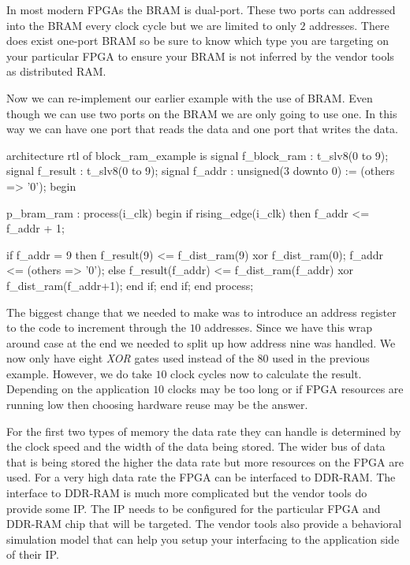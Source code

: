 In most modern \ac{FPGA}s the \ac{BRAM} is dual-port. These two ports can addressed into the \ac{BRAM} every clock cycle but we are limited to only $2$ addresses. There does exist one-port \ac{BRAM} so be sure to know which type you are targeting on your particular \ac{FPGA} to ensure your \ac{BRAM} is not inferred by the vendor tools as distributed \ac{RAM}.

Now we can re-implement our earlier example with the use of \ac{BRAM}. Even though we can use two ports on the \ac{BRAM} we are only going to use one. In this way we can have one port that reads the data and one port that writes the data. 

\begin{VHDLlisting}[tabsize=4]
architecture rtl of block_ram_example is
    signal f_block_ram : t_slv8(0 to 9);
    signal f_result    : t_slv8(0 to 9);
    signal f_addr      : unsigned(3 downto 0) := (others => '0');
begin

p_bram_ram : process(i_clk)
begin
    if rising_edge(i_clk) then
        f_addr <= f_addr + 1;
		
        if f_addr = 9 then
            f_result(9) <= f_dist_ram(9) xor f_dist_ram(0);
            f_addr <= (others => '0');
        else
            f_result(f_addr) <= f_dist_ram(f_addr) xor 
                                            f_dist_ram(f_addr+1);
        end if;
    end if;
end process;
\end{VHDLlisting}

The biggest change that we needed to make was to introduce an address register to the code to increment through the $10$ addresses. Since we have this wrap around case at the end we needed to split up how address nine was handled. We now only have eight \emph{XOR} gates used instead of the $80$ used in the previous example. However, we do take $10$ clock cycles now to calculate the result. Depending on the application $10$ clocks may be too long or if \ac{FPGA} resources are running low then choosing hardware reuse may be the answer. 
	
For the first two types of memory the data rate they can handle is determined by the clock speed and the width of the data being stored. The wider bus of data that is being stored the higher the data rate but more resources on the \ac{FPGA} are used. For a very high data rate the \ac{FPGA} can be interfaced to \ac{DDR}-\ac{RAM}. The interface to \ac{DDR}-\ac{RAM} is much more complicated but the vendor tools do provide some \ac{IP}. The \ac{IP} needs to be configured for the particular \ac{FPGA} and \ac{DDR}-\ac{RAM} chip that will be targeted. The vendor tools also provide a behavioral simulation model that can help you setup your interfacing to the application side of their \ac{IP}. 

